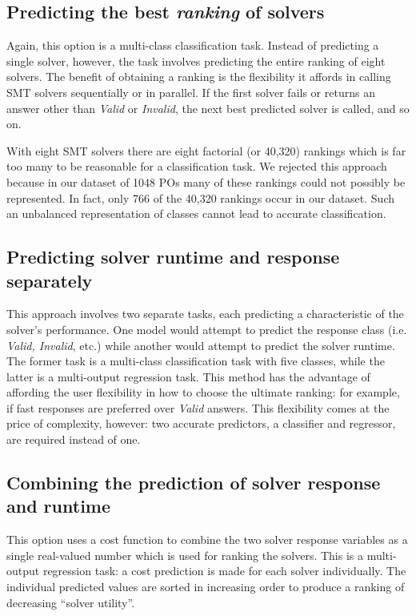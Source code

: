 \subsection{Predicting the best \textit{ranking} of solvers} Again, this option is a multi-class classification task. 
Instead of predicting a single solver, however, the task involves predicting the entire ranking of eight solvers. 
The benefit of obtaining a ranking is the flexibility it affords in calling SMT solvers sequentially or in parallel.
If the first solver fails or returns an answer other than \textit{Valid} or \textit{Invalid}, the next best predicted solver is called, and so on.

With eight SMT solvers there are eight factorial (or 40,320) rankings which is far too many to be reasonable for a classification task. 
We rejected this approach because in our dataset of 1048 POs many of these rankings could not possibly be represented.
In fact, only 766 of the 40,320 rankings occur in our dataset.  
Such an unbalanced representation of classes cannot lead to accurate classification.
\subsection{Predicting solver runtime and response separately}
This approach involves two separate tasks, each predicting a characteristic of the solver's performance. 
One model would attempt to predict the response class (i.e. \textit{Valid, Invalid}, etc.) while another would attempt to predict the solver runtime.
The former task is a multi-class classification task with five classes, while the latter is a multi-output regression task.
This method has the advantage of affording the user flexibility in how to choose the ultimate ranking: for example, if fast responses are preferred over \textit{Valid} answers.
This flexibility comes at the price of complexity, however: two accurate predictors, a classifier and regressor, are required instead of one.
\subsection{Combining the prediction of solver response and runtime}
This option uses a cost function to combine the two solver response variables as a single real-valued number which is used for ranking the solvers.
This is a multi-output regression task: a cost prediction is made for each solver individually.
The individual predicted values are sorted in increasing order to produce a ranking of decreasing ``solver utility''.

